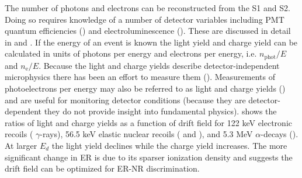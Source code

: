 The number of photons and electrons can be reconstructed from the S1 and S2.  Doing so requires knowledge of a number of detector
variables including PMT quantum efficiencies () and electroluminescence
().  These are discussed in detail in  and
.  If the energy of an event is known the light yield and charge yield can be calculated
in units of photons per energy and electrons per energy, i.e. $n_{\mathrm{phot}}/E$ and $n_{\mathrm{e}}/E$.  Because the light and charge
yields describe detector-independent microphysics there has been an effort to measure them
().  Measurements of photoelectrons per energy may also be referred to as light and charge
yields () and are useful for monitoring detector conditions (because they are detector-dependent they do not
provide insight into fundamental physics).   shows the ratios of light and
charge yields as a function of drift field for 122 keV electronic recoils ( $\gamma$-rays), 56.5 keV elastic nuclear recoils
( and ), and
5.3 MeV $\alpha$-decays ().  At larger $E_d$ the light yield declines while the charge yield increases.  The more
significant change in ER is due to its sparser ionization density and suggests the drift field can be optimized for ER-NR discrimination.

